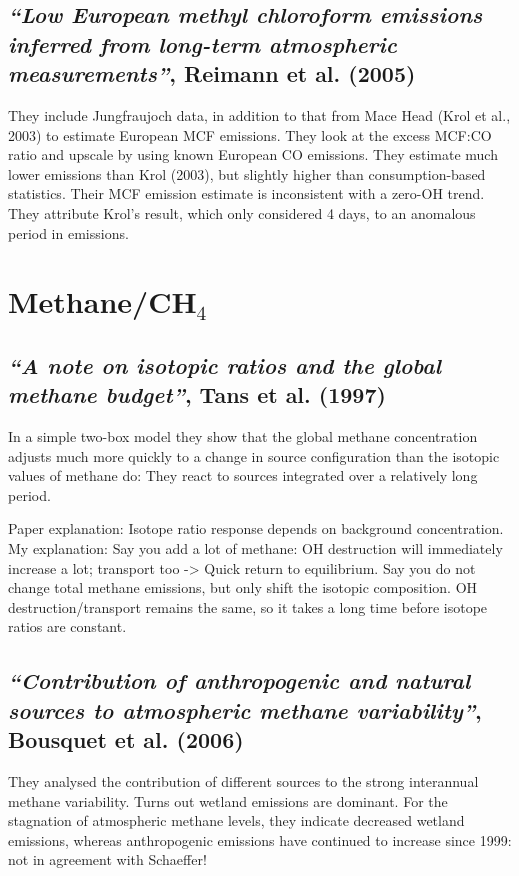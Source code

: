 \documentclass{article}
\begin{document}
\subsection{\textit{“Low European methyl chloroform emissions inferred from long-term atmospheric measurements”}, Reimann et al. (2005)}
They include Jungfraujoch data, in addition to that from Mace Head (Krol et al., 2003) to estimate European MCF emissions. They look at the excess MCF:CO ratio and upscale by using known European CO emissions. They estimate much lower emissions than Krol (2003), but slightly higher than consumption-based statistics. Their MCF emission estimate is inconsistent with a zero-OH trend.  They attribute Krol’s result, which only considered 4 days, to an anomalous period in emissions.

\section{Methane/CH$_4$}

\subsection{\textit{“A note on isotopic ratios and the global methane budget”}, Tans et al. (1997)}
In a simple two-box model they show that the global methane concentration adjusts much more quickly to a change in source configuration than the isotopic values of methane do: They react to sources integrated over a relatively long period.

Paper explanation: Isotope ratio response depends on background concentration. My explanation: Say you add a lot of methane: OH destruction will immediately increase a lot; transport too -> Quick return to equilibrium. Say you do not change total methane emissions, but only shift the isotopic composition. OH destruction/transport remains the same, so it takes a long time before isotope ratios are constant.

\subsection{\textit{“Contribution of anthropogenic and natural sources to atmospheric methane variability”}, Bousquet et al. (2006)}
They analysed the contribution of different sources to the strong interannual methane variability. Turns out wetland emissions are dominant. For the stagnation of atmospheric methane levels, they indicate decreased wetland emissions, whereas anthropogenic emissions have continued to increase since 1999: not in agreement with Schaeffer!
\end{document}
